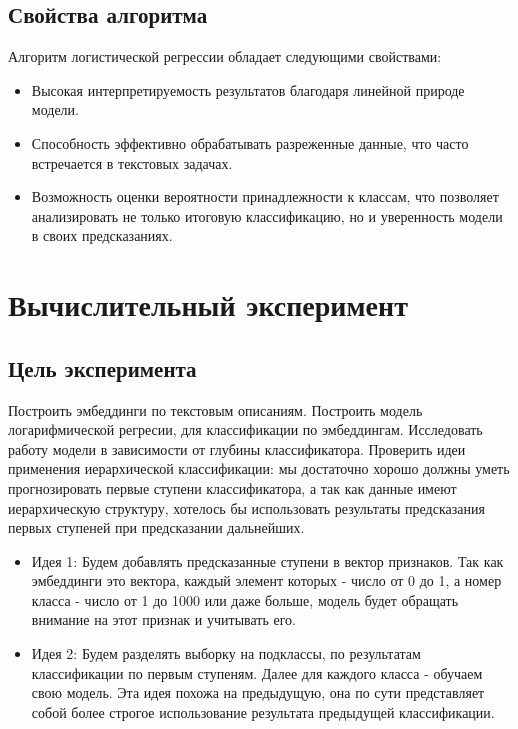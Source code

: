 \documentclass{article}
\begin{document}
\subsection{Свойства алгоритма}

Алгоритм логистической регрессии обладает следующими свойствами:
\begin{itemize}
    \item[\circ] Высокая интерпретируемость результатов благодаря линейной природе модели.
    \item[\circ] Способность эффективно обрабатывать разреженные данные, что часто встречается в текстовых задачах.
    \item[\circ] Возможность оценки вероятности принадлежности к классам, что позволяет анализировать не только итоговую классификацию, но и уверенность модели в своих предсказаниях.
\end{itemize}

\section{Вычислительный эксперимент}
\subsection{Цель эксперимента}
Построить эмбеддинги по текстовым описаниям. Построить модель логарифмической регресии, для классификации по эмбеддингам. Исследовать работу модели в зависимости от глубины классификатора. Проверить идеи применения иерархической классификации: мы достаточно хорошо должны уметь прогнозировать первые ступени классификатора, а так как данные имеют иерархическую структуру, хотелось бы использовать результаты предсказания первых ступеней при предсказании дальнейших.
\begin{itemize}
    \item Идея 1: Будем добавлять предсказанные ступени в вектор признаков. Так как эмбеддинги это вектора, каждый элемент которых - число от 0 до 1, а номер класса - число от 1 до 1000 или даже больше, модель будет обращать внимание на этот признак и учитывать его.
    \item Идея 2: Будем разделять выборку на подклассы, по результатам классификации по первым ступеням. Далее для каждого класса - обучаем свою модель. Эта идея похожа на предыдущую, она по сути представляет собой более строгое использование результата предыдущей классификации. 
    
\end{itemize}
\end{document}
